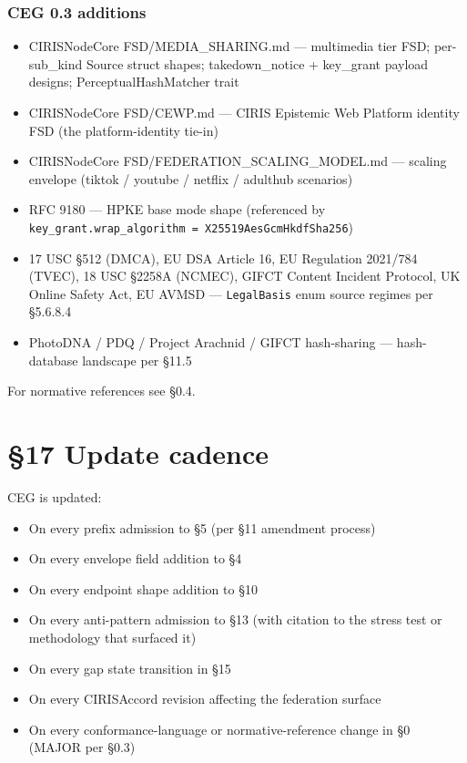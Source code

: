 \documentclass[10pt]{article}
\begin{document}
\subsubsection*{CEG 0.3 additions}


\begin{itemize}\setlength\itemsep{0pt}
\item CIRISNodeCore FSD/MEDIA\_SHARING.md — multimedia tier FSD; per-sub\_kind Source struct shapes; takedown\_notice + key\_grant payload designs; PerceptualHashMatcher trait
\item CIRISNodeCore FSD/CEWP.md — CIRIS Epistemic Web Platform identity FSD (the platform-identity tie-in)
\item CIRISNodeCore FSD/FEDERATION\_SCALING\_MODEL.md — scaling envelope (tiktok / youtube / netflix / adulthub scenarios)
\item RFC 9180 — HPKE base mode shape (referenced by \texttt{key\_grant.wrap\_algorithm = X25519AesGcmHkdfSha256})
\item 17 USC §512 (DMCA), EU DSA Article 16, EU Regulation 2021/784 (TVEC), 18 USC §2258A (NCMEC), GIFCT Content Incident Protocol, UK Online Safety Act, EU AVMSD — \texttt{LegalBasis} enum source regimes per §5.6.8.4
\item PhotoDNA / PDQ / Project Arachnid / GIFCT hash-sharing — hash-database landscape per §11.5
\end{itemize}


For normative references see §0.4.




\clearpage


\section*{§17 Update cadence}


CEG is updated:


\begin{itemize}\setlength\itemsep{0pt}
\item On every prefix admission to §5 (per §11 amendment process)
\item On every envelope field addition to §4
\item On every endpoint shape addition to §10
\item On every anti-pattern admission to §13 (with citation to the stress test or methodology that surfaced it)
\item On every gap state transition in §15
\item On every CIRISAccord revision affecting the federation surface
\item On every conformance-language or normative-reference change in §0 (MAJOR per §0.3)
\end{itemize}
\end{document}
